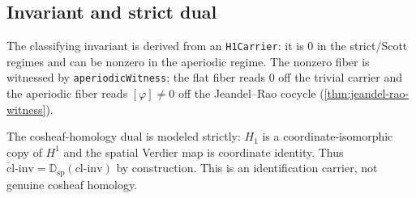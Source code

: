 \subsection{Invariant and strict dual}

\begin{theorem}\label{thm:clinv-dichotomy}\leanok{}
The classifying invariant is derived from an \texttt{H1Carrier}: it is $0$ in
the strict/Scott regimes and can be nonzero in the aperiodic regime.  The
nonzero fiber is witnessed by \texttt{aperiodicWitness}; the flat fiber reads
$0$ off the trivial carrier and the aperiodic fiber reads $[\varphi]\neq0$ off
the Jeandel--Rao cocycle (\cref{thm:jeandel-rao-witness}).
\end{theorem}

\begin{theorem}\label{thm:coclinv-strict-boolean}\leanok{}
The cosheaf-homology dual is modeled strictly: $H_1$ is a coordinate-isomorphic
copy of $H^1$ and the spatial Verdier map is coordinate identity.  Thus
$\check{\mathrm{cl}}\text{-}\mathrm{inv} =
\mathbb{D}_{\mathrm{sp}}(\mathrm{cl\text{-}inv})$ by construction.  This is an
identification carrier, not genuine cosheaf homology.
\end{theorem}

